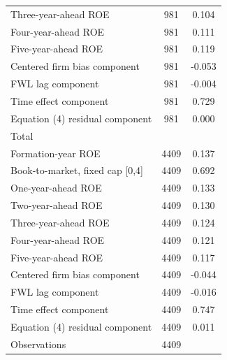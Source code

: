 {\begin{tabular}{l*{1}{cc}}
Three-year-ahead ROE&         981&       0.104\\
Four-year-ahead ROE &         981&       0.111\\
Five-year-ahead ROE &         981&       0.119\\
Centered firm bias component&         981&      -0.053\\
FWL lag component   &         981&      -0.004\\
Time effect component&         981&       0.729\\
Equation (4) residual component&         981&       0.000\\
\hline
Total               &            &            \\
Formation-year ROE  &        4409&       0.137\\
Book-to-market, fixed cap [0,4]&        4409&       0.692\\
One-year-ahead ROE  &        4409&       0.133\\
Two-year-ahead ROE  &        4409&       0.130\\
Three-year-ahead ROE&        4409&       0.124\\
Four-year-ahead ROE &        4409&       0.121\\
Five-year-ahead ROE &        4409&       0.117\\
Centered firm bias component&        4409&      -0.044\\
FWL lag component   &        4409&      -0.016\\
Time effect component&        4409&       0.747\\
Equation (4) residual component&        4409&       0.011\\
\hline
Observations        &        4409&            \\
\hline\hline
\end{tabular}
}
